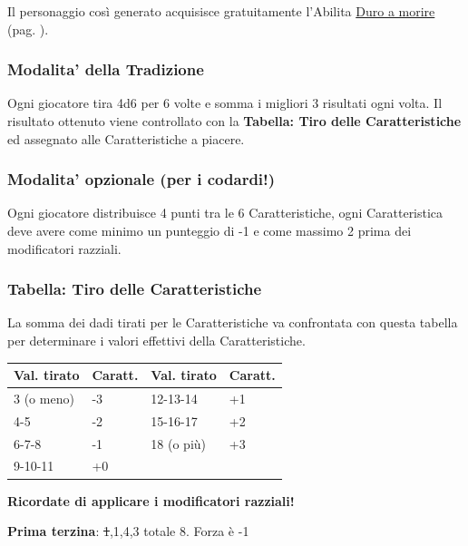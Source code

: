 \begin{multicols}{2}
Il personaggio così generato acquisisce gratuitamente l'Abilita \hyperlink{Duro a morire}{Duro a morire} (pag. \pageref{Duro a morire}).

\subsubsection{Modalita' della Tradizione}\label{modalitadellatradizione}

Ogni giocatore tira 4d6 per 6 volte e somma i migliori 3 risultati ogni volta. Il risultato ottenuto viene controllato con la \textbf{Tabella: Tiro delle Caratteristiche} ed assegnato alle Caratteristiche a piacere.

\subsubsection{Modalita' opzionale (per i codardi!)}\label{modalitapericodardi}

Ogni giocatore distribuisce 4 punti tra le 6 Caratteristiche, ogni Caratteristica deve avere come minimo un punteggio di -1 e come massimo 2 prima dei modificatori razziali.

\subsubsection{Tabella: Tiro delle Caratteristiche}

La somma dei dadi tirati per le Caratteristiche va confrontata con questa tabella per determinare i valori effettivi della Caratteristiche.

\medskip

\begin{tabularx}{0.45\textwidth}{lX|lX}
\textbf{Val. tirato}& \textbf{Caratt.}&\textbf{Val. tirato}& \textbf{Caratt.}\\
\toprule
3 (o meno)&-3&12-13-14&+1\\
4-5&-2&15-16-17&+2\\
6-7-8&-1&18 (o più)&+3\\
9-10-11&+0&&
\end{tabularx}

\medskip

\textbf{Ricordate di applicare i modificatori razziali!}

\medskip

\begin{changemargin}{0.3cm}{0.3cm}\begin{tcolorbox}[title = Tiriamo le Caratteristiche di Tups]
		\textbf{Prima terzina}: \st{1},1,4,3 totale 8. Forza è -1


\end{tcolorbox}
\end{changemargin}
\end{multicols}
